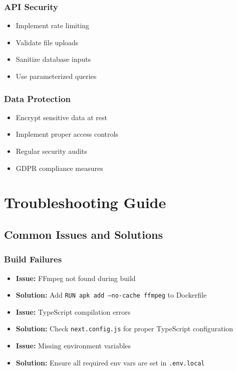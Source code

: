 \documentclass[12pt,a4paper]{article}
\newcommand{\code}[1]{\texttt{#1}}
\begin{document}
\subsubsection{API Security}
\begin{itemize}
    \item Implement rate limiting
    \item Validate file uploads
    \item Sanitize database inputs
    \item Use parameterized queries
\end{itemize}

\subsubsection{Data Protection}
\begin{itemize}
    \item Encrypt sensitive data at rest
    \item Implement proper access controls
    \item Regular security audits
    \item GDPR compliance measures
\end{itemize}

\section{Troubleshooting Guide}

\subsection{Common Issues and Solutions}

\subsubsection{Build Failures}
\begin{itemize}
    \item \textbf{Issue:} FFmpeg not found during build
    \item \textbf{Solution:} Add \code{RUN apk add --no-cache ffmpeg} to Dockerfile

    \item \textbf{Issue:} TypeScript compilation errors
    \item \textbf{Solution:} Check \code{next.config.js} for proper TypeScript configuration

    \item \textbf{Issue:} Missing environment variables
    \item \textbf{Solution:} Ensure all required env vars are set in \code{.env.local}
\end{itemize}
\end{document}
